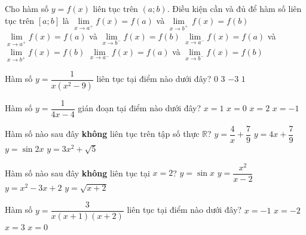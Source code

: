 \begin{ex}%
	Cho hàm số $y=f( x )$ liên tục trên $(a;b)$. Điều kiện cần và đủ để hàm số liên tục trên $\left[a;b \right]$ là
	\choice
	{$\lim\limits_{x\to a^+}f(x)=f(a)$ và $\underset{x\to b^+}{\mathop{\lim }}\,f(x)=f(b)$}
	{\True $\lim\limits_{x\to a^+}f(x)=f(a)$ và $\lim\limits_{x\to b^-}f(x)=f(b)$}
	{$\lim\limits_{x\to a^-}f(x)=f(a)$ và $\lim\limits_{x\to b^+}f(x)=f(b)$}
	{$\lim\limits_{x\to a^-}f(x)=f(a)$ và $\lim\limits_{x\to b^-}f(x)=f(b)$}
\end{ex}
\begin{ex}%
	Hàm số $y=\dfrac{1}{x(x^2-9)}$ liên tục tại điểm nào dưới đây?
	\choice
	{$0$}
	{$3$}
	{$-3$}
	{\True $1$}
\end{ex}
\begin{ex}%
	Hàm số $y=\dfrac{1}{4x-4}$ gián đoạn tại điểm nào dưới đây?
	\choice
	{\True $x=1$}
	{$x=0$}
	{$x=2$}
	{$x=-1$}
\end{ex}
\begin{ex}%
	Hàm số nào sau đây \textbf{không} liên tục trên tập số thực $\mathbb{R}$?
	\choice
	{\True $y=\dfrac{4}{x}+\dfrac{7}{9}$}
	{$y=4x+\dfrac{7}{9}$}
	{$y=\sin2x$}
	{$y=3x^2+\sqrt{5}$}
\end{ex}
\begin{ex}%
	Hàm số nào sau đây \textbf{không} liên tục tại $x=2$?
	\choice
	{$y=\sin x$}
	{\True $y=\dfrac{x^2}{x-2}$}
	{$y=x^2-3x+2$}
	{$y=\sqrt{x+2}$}
\end{ex}
\begin{ex}%
	Hàm số $y=\dfrac{3}{x(x+1)(x+2)}$ liên tục tại điểm nào dưới đây?
	\choice
	{$x=-1$}
	{$x=-2$}
	{\True $x=3$}
	{$x=0$}
\end{ex}
